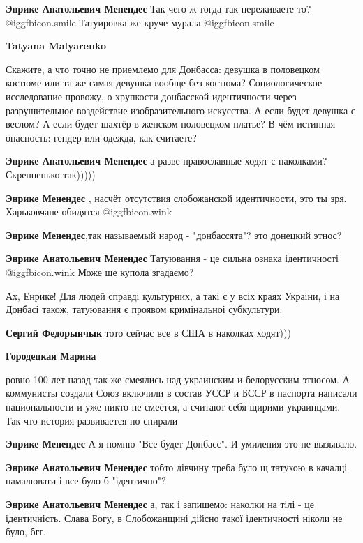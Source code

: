 \begin{itemize}
\begin{itemize}
\textbf{Энрике Анатольевич Менендес} Так чего ж тогда так переживаете-то?  @igg{fbicon.smile}  Татуировка же круче мурала  @igg{fbicon.smile} 

\textbf{Tatyana Malyarenko} 

Скажите, а что точно не приемлемо для Донбасса: девушка в половецком костюме
или та же самая девушка вообще без костюма? Социологическое исследование
провожу, о хрупкости донбасской идентичности через разрушительное воздействие
изобразительного искусства. А если будет девушка с веслом? А если будет шахтёр
в женском половецком платье? В чём истинная опасность: гендер или одежда, как
считаете?

\textbf{Энрике Анатольевич Менендес} а разве православные ходят с наколками? Скрепненько так)))))

\textbf{Энрике Менендес} , насчёт отсутствия слобожанской идентичности, это ты зря. Харьковчане обидятся  @igg{fbicon.wink} 

\textbf{Энрике Менендес},так называемый народ - "донбассята"? это донецкий этнос?

\textbf{Энрике Анатольевич Менендес}
Татуювання - це сильна ознака ідентичності  @igg{fbicon.wink} 
Може ще купола згадаємо?


Ах, Енрике! Для людей справді культурних, а такі є у всіх краях Украіни, і на
Донбасі також, татуювання є проявом кримінальноі субкультури.

\textbf{Сергий Федорынчык} тото сейчас все в США в наколках ходят)))

\textbf{Городецкая Марина} 

ровно 100 лет назад так же смеялись над украинским и белорусским этносом. А
коммунисты создали Союз включили в состав УССР и БССР в паспорта написали
национальности и уже никто не смеётся, а считают себя щирими украинцами. Так
что история развивается по спирали

\textbf{Энрике Менендес} А я помню "Все будет Донбасс". И умиления это не вызывало.

\textbf{Энрике Анатольевич Менендес} тобто дівчину треба було щ татухою в качалці намалювати і все було б "ідентично"?

\textbf{Энрике Анатольевич Менендес} а, так і запишемо: наколки на тілі - це ідентичність. Слава Богу, в Слобожанщині дійсно такої ідентичності ніколи не було, бгг.


\end{itemize}
\end{itemize}
